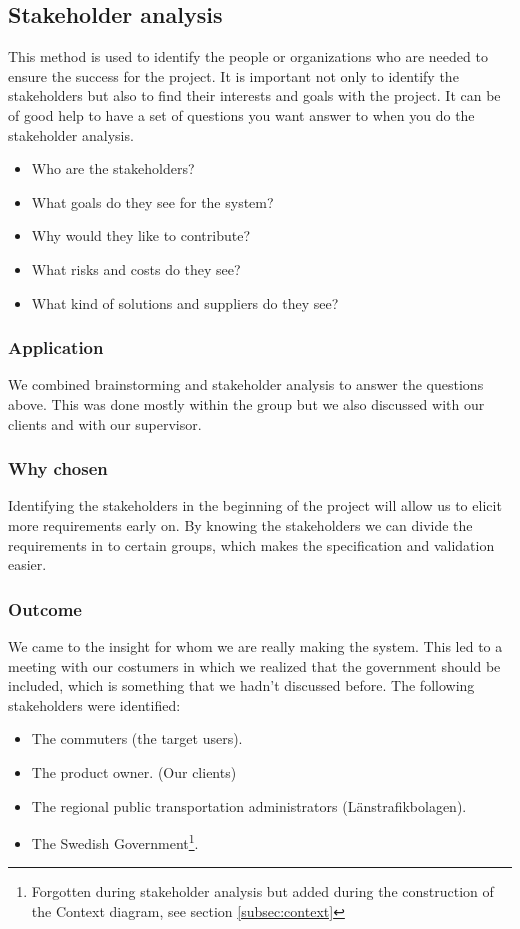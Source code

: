 \documentclass[a4paper]{article}
\begin{document}
    \subsection{Stakeholder analysis}
 This method is used to identify the people or organizations who are needed to ensure the success for the project. It is important not only to identify the stakeholders but also to find their interests and goals with the project. It can be of good help to have a set of questions you want answer to when you do the stakeholder analysis.

    \begin{itemize}
      \item Who are the stakeholders?
      \item What goals do they see for the system?
      \item Why would they like to contribute?
      \item What risks and costs do they see?
      \item What kind of solutions and suppliers do they see?
    \end{itemize}
    
    \subsubsection{Application}
 We combined brainstorming and stakeholder analysis to answer the questions above. This was done mostly within the group but we also discussed with our clients and with our supervisor.
    \subsubsection{Why chosen}
    Identifying the stakeholders in the beginning of the project will allow us to elicit more requirements early on. By knowing the stakeholders we can divide the requirements in to certain groups, which makes the specification and validation easier.
    \subsubsection{Outcome}
We came to the insight for whom we are really making the system. This led to a meeting with our costumers in which we realized that the government should be included, which is something that we hadn’t discussed before.
	The following stakeholders were identified:

    \begin{itemize}
      \item The commuters (the target users).
      \item The product owner. (Our clients)
      \item The regional public transportation administrators (Länstrafikbolagen). 
      \item The Swedish Government\footnote{Forgotten during stakeholder analysis but added during the construction of the Context diagram, see section \ref{subsec:context}}.
    \end{itemize}
    
\end{document}
